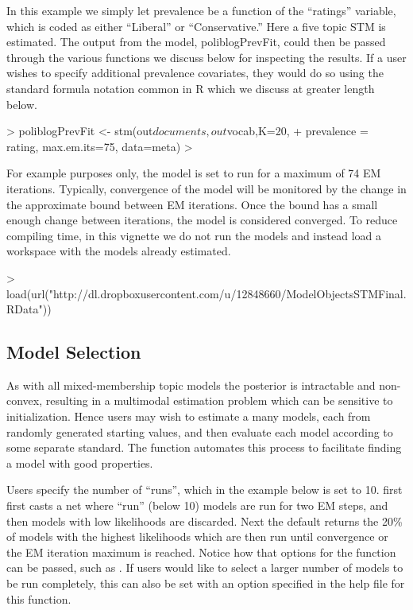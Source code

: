 \documentclass[nojss]{jss}
\begin{document}
In this example we simply let prevalence be a function of the ``ratings'' variable, which is coded as either ``Liberal'' or ``Conservative.'' Here a five topic STM is estimated. The output from the model, poliblogPrevFit, could then be passed through the various functions we discuss below for inspecting the results. If a user wishes to specify additional prevalence covariates, they would do so using the standard formula notation common in R which we discuss at greater length below.

\begin{Schunk}
\begin{Sinput}
> poliblogPrevFit <- stm(out$documents,out$vocab,K=20,
+             prevalence =~ rating, max.em.its=75, data=meta)
> 
\end{Sinput}
\end{Schunk}

For example purposes only, the model is set to run for a maximum of 74 EM iterations.  Typically, convergence of the model will be monitored by the change in the approximate bound between EM iterations.  Once the bound has a small enough change between iterations, the model is considered converged. To reduce compiling time, in this vignette we do not run the models and instead load a workspace with the models already estimated.

\begin{Schunk}
\begin{Sinput}
>  load(url("http://dl.dropboxusercontent.com/u/12848660/ModelObjectsSTMFinal.RData"))
\end{Sinput}
\end{Schunk}

\subsection{Model Selection}

As with all mixed-membership topic models the posterior is intractable and non-convex, resulting in a multimodal estimation problem which can be sensitive to initialization. Hence users may wish to estimate a many models, each from randomly generated starting values, and then evaluate each model according to some separate standard. The function  automates this process to facilitate finding a model with good properties.

Users specify the number of ``runs'', which in the example below is set to 10.  first first casts a net where ``run'' (below 10) models are run for two EM steps, and then models with low likelihoods are discarded. Next the default returns the 20\% of models with the highest likelihoods which are then run until convergence or the EM iteration maximum is reached. Notice how that options for the  function can be passed, such as . If users would like to select a larger number of models to be run completely, this can also be set with an option specified in the help file for this function.
\end{document}
